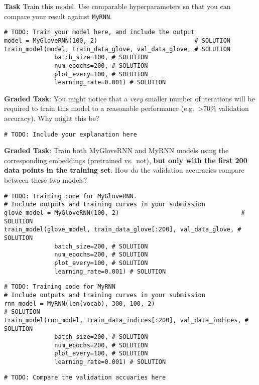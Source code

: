 \documentclass[
  letterpaper,
  DIV=11,
  numbers=noendperiod]{scrartcl}
\begin{document}
\textbf{Task} Train this model. Use comparable hyperparameters so that
you can compare your result against \texttt{MyRNN}.

\begin{verbatim}
# TODO: Train your model here, and include the output
model = MyGloveRNN(100, 2)                           # SOLUTION
train_model(model, train_data_glove, val_data_glove, # SOLUTION
              batch_size=100, # SOLUTION
              num_epochs=200, # SOLUTION
              plot_every=100, # SOLUTION
              learning_rate=0.001) # SOLUTION
\end{verbatim}

\textbf{Graded Task}: You might notice that a \emph{very} smaller number
of iterations will be required to train this model to a reasonable
performance (e.g.~\textgreater70\% validation accuracy). Why might this
be?

\begin{verbatim}
# TODO: Include your explanation here
\end{verbatim}

\textbf{Graded Task}: Train both MyGloveRNN and MyRNN models using the
corresponding embeddings (pretrained vs.~not), \textbf{but only with the
first 200 data points in the training set}. How do the validation
accuracies compare between these two models?

\begin{verbatim}
# TODO: Training code for MyGloveRNN.
# Include outputs and training curves in your submission
glove_model = MyGloveRNN(100, 2)                                  # SOLUTION
train_model(glove_model, train_data_glove[:200], val_data_glove, # SOLUTION
              batch_size=200, # SOLUTION
              num_epochs=200, # SOLUTION
              plot_every=100, # SOLUTION
              learning_rate=0.001) # SOLUTION
\end{verbatim}

\begin{verbatim}
# TODO: Training code for MyRNN
# Include outputs and training curves in your submission
rnn_model = MyRNN(len(vocab), 300, 100, 2)                                  # SOLUTION
train_model(rnn_model, train_data_indices[:200], val_data_indices, # SOLUTION
              batch_size=200, # SOLUTION
              num_epochs=200, # SOLUTION
              plot_every=100, # SOLUTION
              learning_rate=0.001) # SOLUTION
\end{verbatim}

\begin{verbatim}
# TODO: Compare the validation accuaries here
\end{verbatim}
\end{document}
